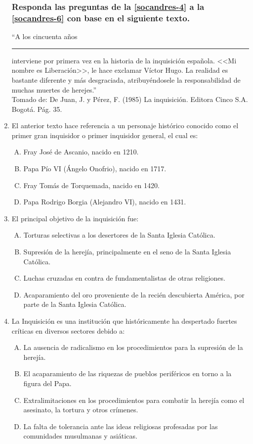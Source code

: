 \begin{enumerate}
\subsubsection{Responda las preguntas de la \ref{socandres-4} a la \ref{socandres-6} con base en el siguiente texto.}
``A los cincuenta años \rule{3cm}{1pt} interviene por primera vez en la historia de la inquisición española. <<Mi nombre es Liberación>>, le hace exclamar Víctor Hugo. La realidad es bastante diferente y más desgraciada, atribuyéndosele la responsabilidad de muchas muertes de herejes.''\\{\footnotesize Tomado de: De Juan, J. y Pérez, F. (1985) La inquisición. Editora Cinco S.A. Bogotá. Pág. 35.}

\item El anterior texto hace referencia a un personaje histórico conocido como el primer gran inquisidor o primer inquisidor general, el cual es: \label{socandres-4}

\begin{enumerate}[(A)]
\item Fray José de Ascanio, nacido en 1210.
\item Papa Pío VI (Ángelo Onofrio), nacido en 1717.
\item Fray Tomás de Torquemada, nacido en 1420.
\item Papa Rodrigo Borgia (Alejandro VI), nacido en 1431. 
\end{enumerate}

\item El principal objetivo de la inquisición fue:\label{socandres-5}
\begin{enumerate}[(A)]
\item Torturas selectivas a los desertores de la Santa Iglesia Católica.
\item Supresión de la herejía, principalmente en el seno de la Santa Iglesia Católica.
\item Luchas cruzadas en contra de fundamentalistas de otras religiones.
\item Acaparamiento del oro proveniente de la recién descubierta América, por parte de la Santa Iglesia Católica. 
\end{enumerate}

\item La Inquisición es una institución que históricamente ha despertado fuertes críticas en diversos sectores debido a:\label{socandres-6}
\begin{enumerate}[(A)]
\item La ausencia de radicalismo en los procedimientos para la supresión de la herejía.
\item El acaparamiento de las riquezas de pueblos periféricos en torno a la figura del Papa.
\item Extralimitaciones en los procedimientos para combatir la herejía como el asesinato, la tortura y otros crímenes.
\item La falta de tolerancia ante las ideas religiosas profesadas por las comunidades musulmanas y asiáticas.
\end{enumerate}


\end{enumerate}
